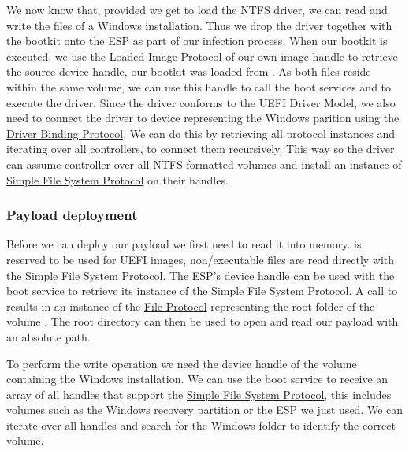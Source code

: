 We now know that, provided we get to load the \ac{NTFS} driver, we can read and write the files of a Windows installation.
Thus we drop the driver together with the bootkit onto the \ac{ESP} as part of our infection process.
When our bootkit is executed, we use the \hyperref[lst:loaded-image-protocol]{Loaded Image Protocol} of our own image handle to retrieve the source device handle, our bootkit was loaded from \cite[Section 9.1]{uefi-spec}.
As both files reside within the same volume, we can use this handle to call the boot services  and  to execute the driver.
Since the driver conforms to the \ac{UEFI} Driver Model, we also need to connect the driver to device representing the Windows parition using the \hyperref[lst:driver-binding-protocol]{Driver Binding Protocol}.
We can do this by retrieving all protocol instances and iterating over all controllers, to connect them recursively.
This way so the driver can assume controller over all \ac{NTFS} formatted volumes and install an instance of \hyperref[lst:simple-file-system-protocol]{Simple File System Protocol} on their handles.

\subsubsection{Payload deployment}

Before we can deploy our payload we first need to read it into memory.
 is reserved to be used for \ac{UEFI} images, non\-/executable files are read directly with the \hyperref[lst:simple-file-system-protocol]{Simple File System Protocol}.
The \ac{ESP}'s device handle can be used with the boot service  to retrieve its instance of the \hyperref[lst:simple-file-system-protocol]{Simple File System Protocol}.
A call to  results in an instance of the \hyperref[lst:simple-file-system-protocol]{File Protocol} representing the root folder of the volume \cite[Section 13.4]{uefi-spec}.
The root directory can then be used to open and read our payload with an absolute path.

To perform the write operation we need the device handle of the volume containing the Windows installation.
We can use the boot service  to receive an array of all handles that support the \hyperref[lst:simple-file-system-protocol]{Simple File System Protocol}, this includes volumes such as the Windows recovery partition or the \ac{ESP} we just used.
We can iterate over all handles and search for the Windows folder to identify the correct volume.

